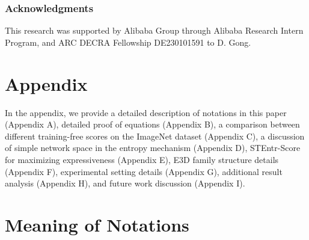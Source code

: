 \documentclass{article} \usepackage{iclr2023_conference,times}
\begin{document}
\subsubsection*{Acknowledgments}


This research was supported by Alibaba Group through Alibaba Research Intern Program, and ARC DECRA Fellowship DE230101591 to D. Gong.





\newpage
\appendix
\section*{Appendix}



In the appendix, we provide a detailed description of notations in this paper (Appendix A), detailed proof of equations (Appendix B), a comparison between different training-free scores on the ImageNet dataset (Appendix C),  a discussion of simple network space in the entropy mechanism (Appendix D), STEntr-Score for maximizing expressiveness (Appendix E), E3D family structure details (Appendix F), experimental setting details (Appendix G), additional result analysis (Appendix H), and future work discussion (Appendix I). 



\section{Meaning of Notations}
\label{sec:notation}
\end{document}
